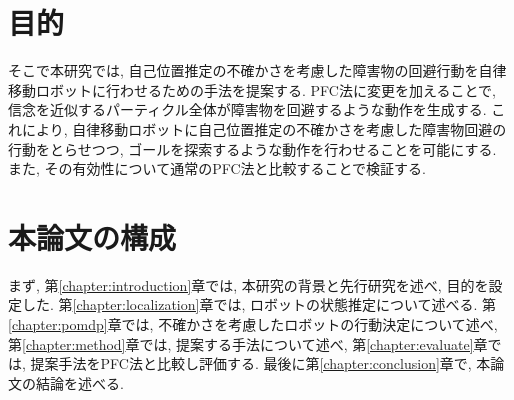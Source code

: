 \section{目的}
そこで本研究では, 自己位置推定の不確かさを考慮した障害物の回避行動を自律移動ロボットに行わせるための手法を提案する. 
PFC法に変更を加えることで, 信念を近似するパーティクル全体が障害物を回避するような動作を生成する. 
これにより, 自律移動ロボットに自己位置推定の不確かさを考慮した障害物回避の行動をとらせつつ, ゴールを探索するような動作を行わせることを可能にする. 
また, その有効性について通常のPFC法と比較することで検証する. 


\section{本論文の構成}
まず, 第\ref{chapter:introduction}章では, 本研究の背景と先行研究を述べ, 目的を設定した. 
第\ref{chapter:localization}章では, ロボットの状態推定について述べる. 
第\ref{chapter:pomdp}章では, 不確かさを考慮したロボットの行動決定について述べ, 
第\ref{chapter:method}章では, 提案する手法について述べ, 
第\ref{chapter:evaluate}章では, 提案手法をPFC法と比較し評価する. 
最後に第\ref{chapter:conclusion}章で, 本論文の結論を述べる. 


